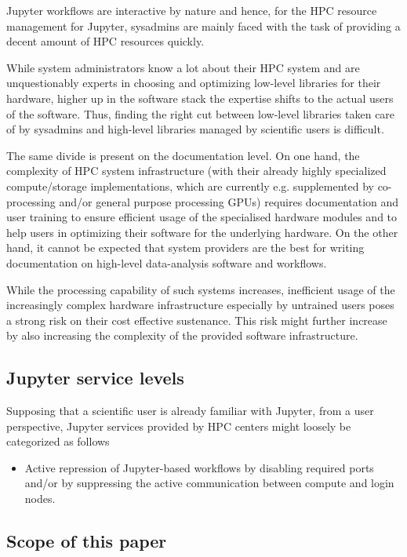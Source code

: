 Jupyter workflows are interactive by nature and hence, for the HPC resource management for Jupyter, sysadmins are mainly faced with the task of providing a decent amount of HPC resources quickly.

While system administrators know a lot about their HPC system and are unquestionably experts in choosing and optimizing low-level libraries for their hardware, higher up in the software stack the expertise shifts to the actual users of the software.
Thus, finding the right cut between low-level libraries taken care of by sysadmins and high-level libraries managed by scientific users is difficult.

The same divide is present on the documentation level.
On one hand, the complexity of HPC system infrastructure (with their already highly specialized compute/storage implementations, which are currently e.g. supplemented by co-processing and/or general purpose processing GPUs) requires documentation and user training to ensure efficient usage of the specialised hardware modules and to help users in optimizing their software for the underlying hardware.
On the other hand, it cannot be expected that system providers are the best for writing documentation on high-level data-analysis software and workflows.

While the processing capability of such systems increases, inefficient usage of the increasingly complex hardware infrastructure especially by untrained users poses a strong risk on their cost effective sustenance\cite{}.
This risk might further increase by also increasing the complexity of the provided software infrastructure.


\subsection{Jupyter service levels}

Supposing that a scientific user is already familiar with Jupyter, from a user perspective, Jupyter services provided by HPC centers might loosely be categorized as follows

\begin{itemize}
  \item Active repression of Jupyter-based workflows by disabling required ports and/or by suppressing the active communication between compute and login nodes.
\end{itemize}

\subsection{Scope of this paper}


